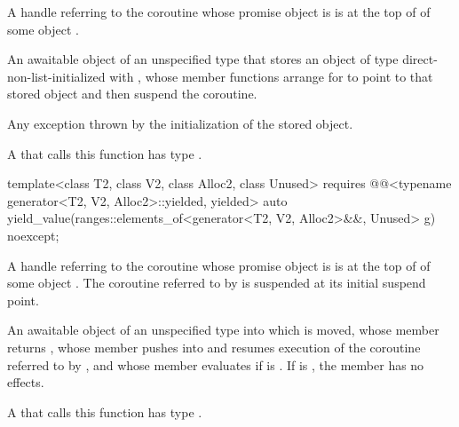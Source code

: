 \begin{itemdescr}
\pnum
\expects
A handle referring to the coroutine
whose promise object is 
is at the top of 
of some  object .

\pnum
\returns
An awaitable object of an unspecified type
that stores an object of type 
direct-non-list-initialized with ,
whose member functions arrange for
 to point to that stored object
and then suspend the coroutine.

\pnum
\throws
Any exception thrown by the initialization of the stored object.

\pnum
\remarks
A  that calls this function
has type .
\end{itemdescr}

%
\begin{itemdecl}
template<class T2, class V2, class Alloc2, class Unused>
  requires @@<typename generator<T2, V2, Alloc2>::yielded, yielded>
  auto yield_value(ranges::elements_of<generator<T2, V2, Alloc2>&&, Unused> g) noexcept;
\end{itemdecl}

\begin{itemdescr}
\pnum
\expects
A handle referring to the coroutine
whose promise object is 
is at the top of 
of some  object .
The coroutine referred to by
is suspended at its initial suspend point.

\pnum
\returns
An awaitable object of an unspecified type
into which  is moved,
whose member  returns ,
whose member 
pushes 
into 
and resumes execution of the coroutine referred to
by , and
whose member  evaluates
if  is .
If  is ,
the  member has no effects.

\pnum
\remarks
A  that calls this function
has type .
\end{itemdescr}

